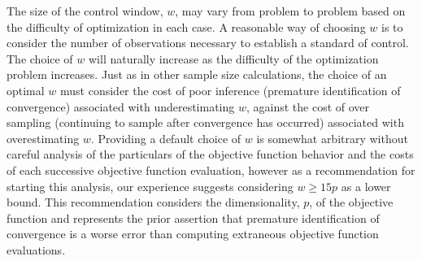 \documentclass[12pt]{article}
\begin{document}
%
The size of the control window, $w$, may vary from problem to problem based on the difficulty of optimization in each case. %
%
A reasonable way of choosing $w$ is to consider the number of observations necessary to establish a standard of control. %
%
The choice of $w$ will naturally increase as the difficulty of the optimization problem increases.
%
%
Just as in other sample size calculations, the choice of an optimal $w$ must consider the cost of poor inference (premature identification of convergence) associated with underestimating $w$, against the cost of over sampling (continuing to sample after convergence has occurred) associated with overestimating $w$.
%
Providing a default choice of $w$ is somewhat arbitrary without careful analysis of the particulars of the objective function behavior and the costs of each successive objective function evaluation, however as a recommendation for starting this analysis, our experience suggests considering $w\ge15p$ as a lower bound. %
%
This recommendation considers the dimensionality, $p$, of the objective function and represents the prior assertion that premature identification of convergence is a worse error than computing extraneous objective function evaluations. 

%
%
%
%
%
\end{document}

